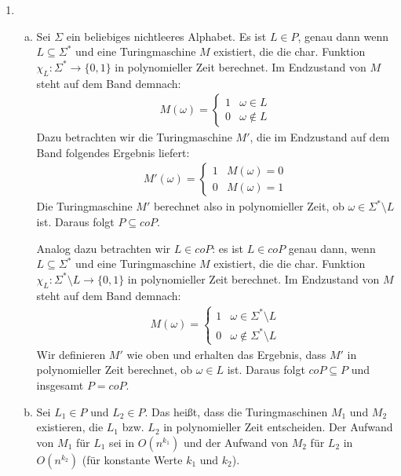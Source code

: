 \begin{enumerate}
  \item
    \begin{enumerate}[(a)]
      \item Sei $\Sigma$ ein beliebiges nichtleeres Alphabet. Es ist $L \in P$,
        genau dann wenn $L \subseteq \Sigma^*$ und eine Turingmaschine $M$
        existiert, die die char. Funktion
        $\chi_L: \Sigma^* \rightarrow \{0, 1\}$
        in polynomieller Zeit berechnet. Im Endzustand von $M$ steht auf dem
        Band demnach:
        \begin{align*}
          M(\omega) = \begin{cases}
            1 & \omega \in L\\
            0 & \omega \notin L
          \end{cases}
        \end{align*}
        Dazu betrachten wir die Turingmaschine $M'$, die im Endzustand auf dem
        Band folgendes Ergebnis liefert:
        \begin{align*}
          M'(\omega) = \begin{cases}
            1 & M(\omega) = 0\\
            0 & M(\omega) = 1
          \end{cases}
        \end{align*}
        Die Turingmaschine $M'$ berechnet also in polynomieller Zeit, ob $\omega
        \in \Sigma^* \setminus L$ ist. Daraus folgt $P \subseteq coP$.

        Analog dazu betrachten wir $L \in coP$: es ist $L \in coP$ genau dann,
        wenn $L \subseteq \Sigma^*$ und eine Turingmaschine $M$ existiert, die die
        char. Funktion
        $\chi_L: \Sigma^* \setminus L \rightarrow \{0, 1\}$
        in polynomieller Zeit berechnet. Im Endzustand von $M$ steht auf dem
        Band demnach:
        \begin{align*}
          M(\omega) = \begin{cases}
            1 & \omega \in \Sigma^* \setminus L\\
            0 & \omega \notin \Sigma^* \setminus L
          \end{cases}
        \end{align*}
        Wir definieren $M'$ wie oben und erhalten das Ergebnis, dass $M'$ in
        polynomieller Zeit berechnet, ob $\omega \in L$ ist. Daraus folgt $coP
        \subseteq P$ und insgesamt $P = coP$.

      \item Sei $L_1 \in P$ und $L_2 \in P$. Das heißt, dass die Turingmaschinen
        $M_1$ und $M_2$ existieren, die $L_1$ bzw. $L_2$ in polynomieller Zeit
        entscheiden. Der Aufwand von $M_1$ für $L_1$ sei in $O(n^{k_1})$ und der
        Aufwand von $M_2$ für $L_2$ in $O(n^{k_2})$ (für konstante Werte $k_1$
        und $k_2$).


\end{enumerate}
\end{enumerate}
